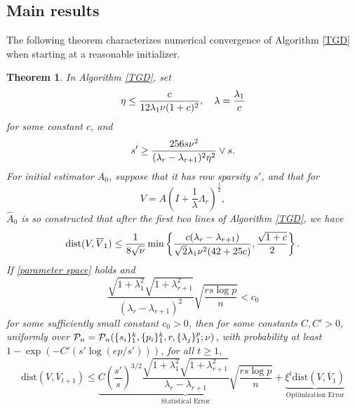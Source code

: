 \documentclass[11pt]{article}
\newcommand{\nb}[1]{\textcolor{orange}{\texttt{[#1]}}}
\newcommand{\rev}[1]{\textcolor{black}{#1}}
\newcommand{\bA}{\widehat{A}}
\newcommand{\hs}{s'}
\newcommand{\scale}{V}
\newcommand{\gd}{\overline{V}}
\newcommand{\0}{{\mathbf{0}}}
\newtheorem{theorem}{Theorem}[section]
\begin{document}
\subsection{Main results}
\label{sec:main-result}


The following theorem characterizes numerical convergence of Algorithm \ref{TGD} when starting at a reasonable initializer. 
\begin{theorem}
\label{mainthe}
In Algorithm \ref{TGD}, set
\begin{equation}
      \label{eq:eta-lambda}
    \eta \leq\frac{c}{12\lambda_1\rev{\nu}(1+c)^2},\quad \lambda = \frac{\lambda_1}{c}
\end{equation}
for some constant $c$, and
\begin{equation}
      \label{eq:s-prime}
\hs \geq \frac{256 s\rev{\nu^2}}{(\lambda_r-\lambda_{r+1})^2\eta^2} \vee s. 
\end{equation} 
For initial estimator $\bA_0$, suppose that it has row sparsity $\hs$, and that for 
\begin{equation}
      \label{eq:V}
\scale=A \left(I+\frac{1}{\lambda}\Lambda_r \right)^{\frac{1}{2}}, 
\end{equation}
$\bA_0$ is so constructed that after the first two lines of Algorithm \ref{TGD}, we have
\begin{equation}\label{eq:radius}
    \mathrm{dist}(\scale,\gd_1)\leq \frac{1}{8\sqrt{\rev{\nu}}}\min\left\{\frac{c(\lambda_r -\lambda_{r+1})}{\sqrt{2}\lambda_1\rev{\nu^2}(42+25c)},\frac{\sqrt{1+c}}{2}\right\}.
\end{equation}
If \eqref{parameter space} holds and
\begin{equation}
      \label{sample size condition}
\frac{\sqrt{1+\lambda_1^2}\sqrt{{1+\lambda_{r+1}^2}}}{(\lambda_r-\lambda_{r+1})^2}\sqrt{\frac{rs\log p}{n}}<c_0
\end{equation}
for some sufficiently small constant $c_0>0$,
then for some constants $C,C'>0$, 
uniformly over $\mathcal{P}_n = \mathcal{P}_n( \{s_i\}_1^k,\{p_i\}_1^k,r,\{\lambda_j\}_1^p;\rev{\nu})$, 
with probability at least $1-\exp(-C'(s'\log(ep/s')))$,
for all $t\geq 1$, 
\begin{equation}\label{stats error and opt error}
    \mathrm{dist}(\scale, \gd_{t+1})\leq \underbrace{C\left(\frac{s'}{s}\right)^{3/2}\frac{\sqrt{1+\lambda_1^2}\sqrt{{1+\lambda_{r+1}^2}}}{\lambda_r-\lambda_{r+1}}\sqrt{\frac{rs\log p}{n}}}_{\text{Statistical Error}}+\underbrace{\xi^t \mathrm{dist}(\scale, \gd_{1})}_{\text{Optimization Error}}

\end{equation}
\end{theorem}
\end{document}
